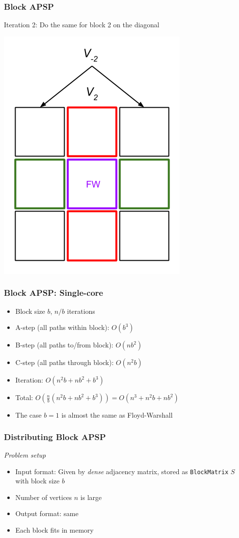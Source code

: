 \documentclass{beamer}
\begin{document}
\begin{frame}
\frametitle{Block APSP}
Iteration 2: Do the same for block 2 on the diagonal
\begin{center}
\includegraphics[scale = 0.4]{blockApsp-5.png}
\end{center}
\end{frame}

\begin{frame}
\frametitle{Block APSP: Single-core}
\begin{itemize}
\item Block size $b$, $n/b$ iterations 
\item A-step (all paths within block): $O(b^3)$
\item B-step (all paths to/from block): $O(nb^2)$
\item C-step (all paths through block): $O(n^2b)$
\item Iteration: $O(n^2 b + nb^2 + b^3)$
\item Total: $O(\frac{n}{b} (n^2 b + nb^2 + b^3)) = O(n^3 + n^2 b + nb^2)$
\item The case $b = 1$ is almost the same as Floyd-Warshall
\end{itemize}
\end{frame}

\begin{frame}
\frametitle{Distributing Block APSP}
\emph{Problem setup}
\begin{itemize}
\item Input format: Given by \emph{dense} adjacency matrix, stored as {\tt BlockMatrix} $S$ with block size $b$
\item Number of vertices $n$ is large
\item Output format: same
\item Each block fits in memory
\end{itemize}
\end{frame}
\end{document}
